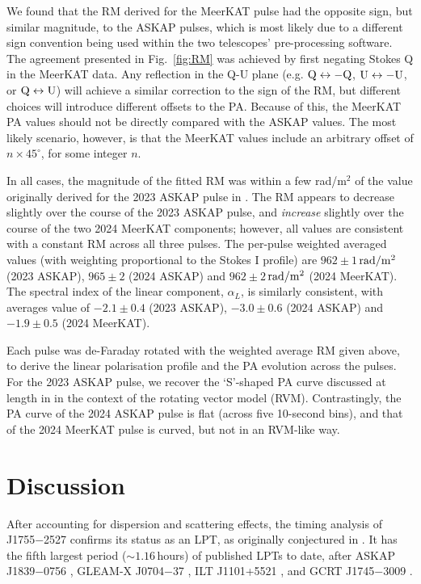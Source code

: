 \documentclass[fleqn,usenatbib]{mnras}
\newcommand{\src}{J1755$-$2527}
\newcommand{\Fig}{Fig.}
\begin{document}
We found that the RM derived for the MeerKAT pulse had the opposite sign, but similar magnitude, to the ASKAP pulses, which is most likely due to a different sign convention being used within the two telescopes' pre-processing software.
The agreement presented in \Fig~\ref{fig:RM} was achieved by first negating Stokes Q in the MeerKAT data.
Any reflection in the Q-U plane (e.g. ${\rm Q} \leftrightarrow -{\rm Q}$, ${\rm U} \leftrightarrow -{\rm U}$, or ${\rm Q} \leftrightarrow {\rm U}$) will achieve a similar correction to the sign of the RM, but different choices will introduce different offsets to the PA.
Because of this, the MeerKAT PA values should not be directly compared with the ASKAP values.
The most likely scenario, however, is that the MeerKAT values include an arbitrary offset of $n \times 45^\circ$, for some integer $n$.

In all cases, the magnitude of the fitted RM was within a few rad/m$^2$ of the value originally derived for the 2023 ASKAP pulse in .
The RM appears to decrease slightly over the course of the 2023 ASKAP pulse, and \emph{increase} slightly over the course of the two 2024 MeerKAT components; however, all values are consistent with a constant RM across all three pulses.
The per-pulse weighted averaged values (with weighting proportional to the Stokes I profile) are $962 \pm 1$\,${\rm rad}/{\rm m}^2$ (2023 ASKAP), $965 \pm 2$ (2024 ASKAP) and $962 \pm 2$\,${\rm rad}/{\rm m}^2$ (2024 MeerKAT).
The spectral index of the linear component, $\alpha_L$, is similarly consistent, with averages value of $-2.1 \pm 0.4$ (2023 ASKAP), $-3.0 \pm 0.6$ (2024 ASKAP) and $-1.9 \pm 0.5$ (2024 MeerKAT).

Each pulse was de-Faraday rotated with the weighted average RM given above, to derive the linear polarisation profile and the PA evolution across the pulses.
For the 2023 ASKAP pulse, we recover the `S'-shaped PA curve discussed at length in  in the context of the rotating vector model (RVM).
Contrastingly, the PA curve of the 2024 ASKAP pulse is flat (across five 10-second bins), and that of the 2024 MeerKAT pulse is curved, but not in an RVM-like way.

\section{Discussion} \label{sec:discussion}

After accounting for dispersion and scattering effects, the timing analysis of \src{} confirms its status as an LPT, as originally conjectured in .
It has the fifth largest period (${\sim}1.16\,$hours) of published LPTs to date, after ASKAP J1839$-$0756 \citep[$6.45\,$hours;][]{Lee2025}, GLEAM-X J0704$-$37 \citep[$2.92\,$hours;][]{2024ApJ...976L..21H,2025A&A...695L...8R}, ILT J1101+5521 \citep[$2.09\,$hours;][]{deRuiter2025}, and GCRT J1745$-$3009 \citep[$1.28\,$hours;][]{2005Natur.434...50H}.
\end{document}
